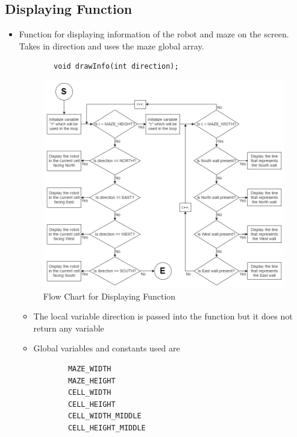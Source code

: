 \documentclass[11pt]{article}
\begin{document}
\subsection{Displaying Function}
\begin{itemize}
\item Function for displaying information of the robot and maze on the screen. Takes in direction and uses the maze global array. 
	\begin{verbatim}
		void drawInfo(int direction);
	\end{verbatim}
\begin{figure}[htp]
\centering
\includegraphics[scale=0.57]{images/Software_Flowchart/Drawing_Function.png}
\caption{Flow Chart for Displaying Function}
\label{}
\end{figure}
	\begin{itemize}
	\item The local variable direction is passed into the function but it does not return any variable
	\item Global variables and constants used are
	\begin{verbatim}
		MAZE_WIDTH
		MAZE_HEIGHT
		CELL_WIDTH
		CELL_HEIGHT
		CELL_WIDTH_MIDDLE
		CELL_HEIGHT_MIDDLE
	\end{verbatim}
	\end{itemize}
\end{itemize}
\newpage

\end{document}
